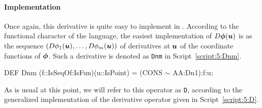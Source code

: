 \documentclass{31x47jw}
\begin{document}
\paragraph{Implementation}

Once again, this derivative is quite easy to implement in \pl. 
According to the functional character of the language, the easiest
implementation of $D{\mbox{\boldmath $\phi$}}({\mbox{\boldmath $u$}})$ is as the sequence
$(D\phi_{1}({\mbox{\boldmath $u$}}),\ldots,D\phi_{m}({\mbox{\boldmath $u$}}))$ of derivatives at ${\mbox{\boldmath $u$}}$
of the coordinate functions of ${\mbox{\boldmath $\phi$}}$. Such a derivative is denoted 
as \texttt{Dnm} in Script~\ref{script:5:Dnm}.

\begin{script}
\begin{smallplasm} 
DEF Dnm (f::IsSeqOf:IsFun)(u::IsPoint) = (CONS  $\sim$  AA:Dn1):f:u;
\end{smallplasm} 
\label{script:5:Dnm}
\end{script}
As is usual at this point, we will refer to this operator as
\texttt{D}, according to the generalized implementation of the
derivative operator given in Script~\ref{script:5:D}.
\end{document}
